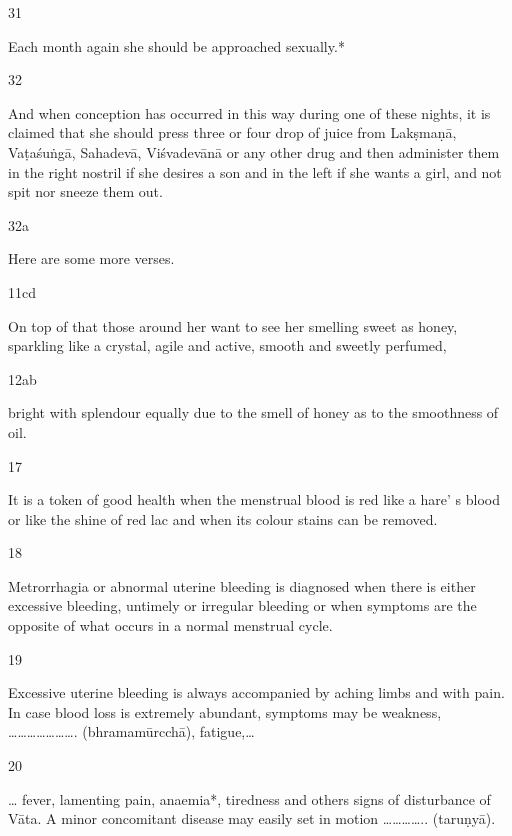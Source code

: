 \begin{translation}
\begin{tt}
\item[31]

Each month again she should be approached sexually.* 
  
\item[32]

And when conception has occurred in this way during one of these 
  nights, it is claimed that she should press three or four drop of juice from 
  Lakṣmaṇā, Vaṭaśuṅgā, Sahadevā, Viśvadevānā or any other drug and then 
  administer them in the right nostril if she desires a son and in the left if she 
  wants a girl, and not spit nor sneeze them out. 
  
\item[32a]

Here are some more verses.
  
\item[11cd]

On top of that those around her want to see her smelling sweet as 
  honey, sparkling like a crystal, agile and active, smooth and sweetly perfumed, 
  
\item[12ab]

bright with splendour equally due to the smell of honey as to the 
  smoothness of oil. 
  
\item[17]

It is a token of good health when the menstrual blood is red like a hare’ s 
  blood or like the shine of red lac and when its colour stains can be removed.
  
\item[18]

Metrorrhagia or abnormal uterine bleeding is diagnosed when there is 
  either excessive bleeding, untimely or irregular bleeding or when symptoms are 
  the opposite of what occurs in a normal menstrual cycle. 
  
\item[19]

 Excessive uterine bleeding is always accompanied by aching limbs and 
  with pain. In case blood loss is extremely abundant, symptoms may be 
  weakness, …………………. (bhramamūrcchā), fatigue,…
  
\item[20]

… fever, lamenting pain, anaemia*, tiredness and others signs of 
  disturbance of Vāta. A minor concomitant disease may easily set in motion 
  ………….. (taruṇyā).
  

\end{tt}
\end{translation}
